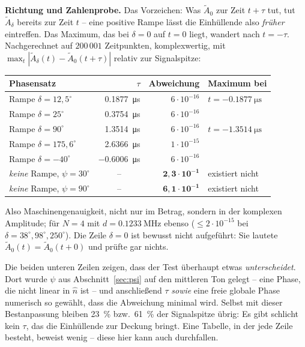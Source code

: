 \documentclass[11pt,a4paper]{article}
\begin{document}
\medskip
\noindent\textbf{Richtung und Zahlenprobe.} Das Vorzeichen: Was $\tilde A_0$
zur Zeit $t+\tau$ tut, tut $\tilde A_\delta$ bereits zur Zeit $t$ -- eine positive
Rampe lässt die Einhüllende also \emph{früher} eintreffen. Das Maximum, das
bei $\delta=0$ auf $t=0$ liegt, wandert nach $t=-\tau$. Nachgerechnet auf
$200\,001$ Zeitpunkten, komplexwertig, mit
$\max_t|\tilde A_\delta(t)-\tilde A_0(t+\tau)|$ relativ zur Signalspitze:

\begin{center}
\begin{tabular}{lrrl}
  \toprule
  Phasensatz & $\tau$ & Abweichung & Maximum bei\\
  \midrule
  Rampe $\delta=12{,}5^\circ$  & \SI{0.1877}{\micro\second} & $6\cdot10^{-16}$ & $t=\SI{-0.1877}{\micro\second}$\\
  Rampe $\delta=25^\circ$      & \SI{0.3754}{\micro\second} & $6\cdot10^{-16}$ & \\
  Rampe $\delta=90^\circ$      & \SI{1.3514}{\micro\second} & $6\cdot10^{-16}$ & $t=\SI{-1.3514}{\micro\second}$\\
  Rampe $\delta=175{,}6^\circ$ & \SI{2.6366}{\micro\second} & $1\cdot10^{-15}$ & \\
  Rampe $\delta=-40^\circ$     & \SI{-0.6006}{\micro\second}& $6\cdot10^{-16}$ & \\
  \midrule
  \emph{keine} Rampe, $\psi=30^\circ$ & \multicolumn{1}{c}{--} & $\mathbf{2{,}3\cdot10^{-1}}$ & existiert nicht\\
  \emph{keine} Rampe, $\psi=90^\circ$ & \multicolumn{1}{c}{--} & $\mathbf{6{,}1\cdot10^{-1}}$ & existiert nicht\\
  \bottomrule
\end{tabular}
\end{center}

\noindent Also Maschinengenauigkeit, nicht nur im Betrag, sondern in der
komplexen Amplitude; für $N=4$ mit $d=\SI{0.1233}{\mega\hertz}$ ebenso
($\le2\cdot10^{-15}$ bei $\delta = 38^\circ, 98^\circ, 250^\circ$). Die
Zeile $\delta=0$ ist bewusst nicht aufgeführt: Sie lautete
$\tilde A_0(t)=\tilde A_0(t+0)$ und prüfte gar nichts.

Die beiden unteren Zeilen zeigen, dass der Test überhaupt etwas
\emph{unterscheidet}. Dort wurde $\psi$ aus Abschnitt~\ref{sec:psi} auf den
mittleren Ton gelegt -- eine Phase, die nicht linear in $\hat n$ ist -- und
anschließend $\tau$ \emph{sowie} eine freie globale Phase numerisch so gewählt,
dass die Abweichung minimal wird. Selbst mit dieser Bestanpassung bleiben
\SI{23}{\percent} bzw.\ \SI{61}{\percent} der Signalspitze übrig: Es gibt
schlicht kein $\tau$, das die Einhüllende zur Deckung bringt. Eine Tabelle,
in der jede Zeile besteht, beweist wenig -- diese hier kann auch durchfallen.
\end{document}
